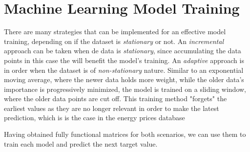 \documentclass[12pt]{report} %
\begin{document}
\section{Machine Learning Model Training}

There are many strategies that can be implemented for an effective model training, depending on if the dataset is \textit{stationary} or not. An \textit{incremental} approach can be taken when de data is  \textit{stationary}, since accumulating the data points in this case the will benefit the model's training. An \textit{adaptive} approach is in order when the dataset is of \textit{non-stationary} nature. Similar to an exponential moving average, where the newer data holds more weight, while the older data's importance is progressively minimized, the model is trained on a sliding window, where the older data points are cut off. This training method "forgets" the earliest values as they are no longer relevant in order to make the latest prediction, which is is the case in the energy prices database

Having obtained fully functional matrices for both scenarios, we can use them to train each model and predict the next target value.
\end{document}
